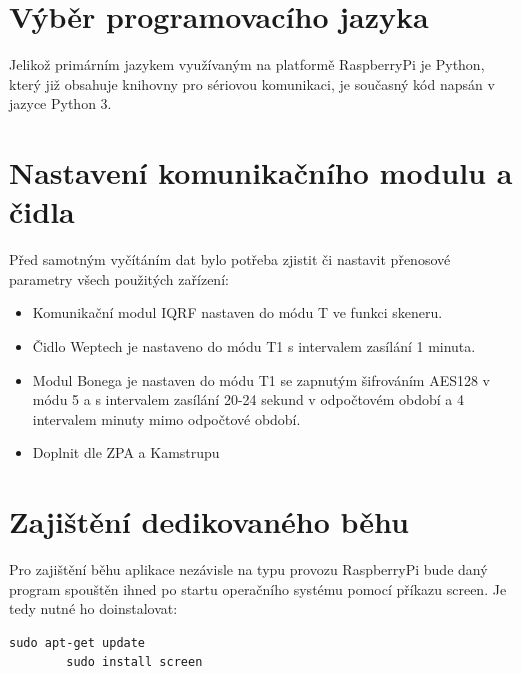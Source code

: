\section{Výběr programovacího jazyka}
Jelikož primárním jazykem využívaným na platformě RaspberryPi je Python, který již obsahuje knihovny pro sériovou komunikaci, je současný kód napsán v jazyce Python 3.


\section{Nastavení komunikačního modulu a čidla}

Před samotným vyčítáním dat bylo potřeba zjistit či nastavit přenosové parametry všech použitých zařízení:

\begin{itemize}
	\item Komunikační modul IQRF nastaven do módu T ve funkci skeneru.
	\item Čidlo Weptech je nastaveno do módu T1 s intervalem zasílání 1 minuta. 
	\item Modul Bonega je nastaven do módu T1 se zapnutým šifrováním AES128 v módu 5 a s intervalem zasílání 20-24 sekund v odpočtovém období a 4 intervalem minuty mimo odpočtové období.
	\item \colorbox[rgb]{0,1,0}{Doplnit dle ZPA a Kamstrupu}
\end{itemize}


\section{Zajištění dedikovaného běhu}
Pro zajištění běhu aplikace nezávisle na typu provozu RaspberryPi bude daný program spouštěn ihned po startu operačního systému pomocí příkazu screen. Je tedy nutné ho doinstalovat:
 
\begin{lstlisting}[style=MyCodeBash]
		sudo apt-get update
		sudo install screen		
	\end{lstlisting}


